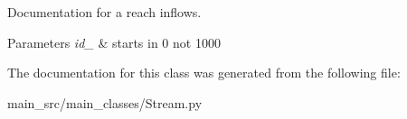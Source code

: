 Documentation for a reach inflows. 


\begin{DoxyParams}{Parameters}
{\em id\-\_\-} & starts in 0 not 1000 \\
\hline
\end{DoxyParams}


The documentation for this class was generated from the following file\-:\begin{DoxyCompactItemize}
\item 
main\-\_\-src/main\-\_\-classes/Stream.\-py\end{DoxyCompactItemize}
